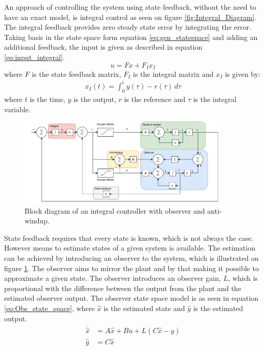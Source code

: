 \documentclass[../../main.tex]{subfiles}
\begin{document}
An approach of controlling the system using state feedback, without the need to have an exact model, is integral control as seen on figure \ref{fig:Integral_Diagram}. The integral feedback provides zero steady state error by integrating the error. Taking basis in the state space form equation \ref{eq:gen_statespace} and adding an additional feedback, the input is given as described in equation \ref{eq:input_integral}.
\begin{equation}\label{eq:input_integral}
    u=Fx+F_Ix_I
\end{equation}
where $F$ is the state feedback matrix, $F_I$ is the integral matrix and $x_I$ is given by:
\begin{equation}
    \begin{split}
        x_I(t)=\int_0^t y(\tau)-r(\tau)\,d\tau
    \end{split}
\end{equation}
where $t$ is the time, $y$ is the output, $r$ is the reference and $\tau$ is the integral variable.

\begin{figure}
    \centering
    \includegraphics[width=0.9\textwidth]{Sections/Miscellaneous/Images/Anti_Windup_Integral_Observer.pdf}
    \caption{Block diagram of an integral controller with observer and anti-windup.}
    \label{fig:Integral_Observer_Diagram}
\end{figure}

State feedback requires that every state is known, which is not always the case. However means to estimate states of a given system is available. The estimation can be achieved by introducing an observer to the system, which is illustrated on figure \ref{fig:Integral_Observer_Diagram}. The observer aims to mirror the plant and by that making it possible to approximate a given state.
The observer introduces an observer gain, $L$, which is proportional with the difference between the output from the plant and the estimated observer output. The observer state space model is as seen in equation \ref{eq:Obs_state_space}, where $\hat{x}$ is the estimated state and $\hat{y}$ is the estimated output.
\begin{equation}\label{eq:Obs_state_space}
    \begin{split}
        \Dot{\hat{x}}&=A\hat{x}+Bu+L(C\hat{x}-y)\\
        \hat{y}&=C\hat{x}
    \end{split}
\end{equation}
\end{document}
